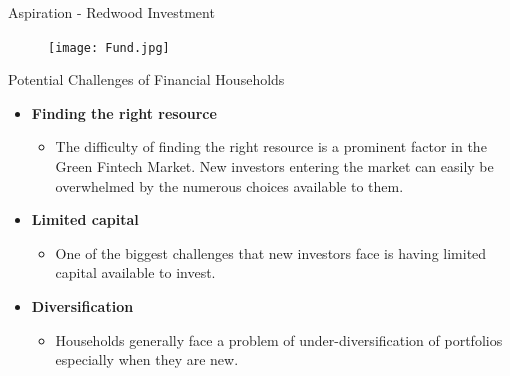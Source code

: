\documentclass{beamer}
\begin{document}
\begin{frame}{Aspiration - Redwood Investment }
\begin{itemize}




  

    \begin{figure}[htp]
    \centering
    \texttt{[image: Fund.jpg]}
    
\end{figure}       
        



\end{itemize}
\end{frame}



\begin{frame}{Potential Challenges of Financial Households}
\begin{itemize}
\item \textbf{Finding the right resource}
\begin{itemize} \item The difficulty of finding the right resource is a prominent factor in the Green Fintech Market. New investors entering the market can easily be overwhelmed by the numerous choices available to them.
\end{itemize}

\item \textbf{ Limited capital}
\begin{itemize}
    \item One of the biggest challenges that new investors face is having limited capital available to invest.
\end{itemize}


\item \textbf{Diversification}
\begin{itemize}
    \item Households generally face a problem of under-diversification of portfolios especially when they are new.
\end{itemize}

    



\end{itemize}
\end{frame}
\end{document}
